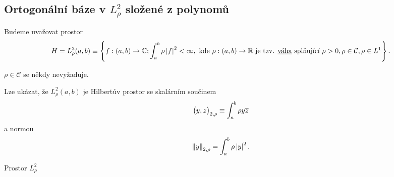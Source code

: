 \subsection{Ortogonální báze v $L^{2}_{\rho}$ složené z polynomů}
Budeme uvažovat prostor
\begin{align*}
    H = L^{2}_{\rho} (a, b) \equiv \left\{ f : (a, b) \to \mathbb{C} ; \int_a^b \rho \left|f\right|^2 < \infty, \text{ kde } \rho : (a, b) \to \mathbb{R} \text{ je tzv. \underline{váha} splňující } \rho > 0, \rho \in \mathcal{C}, \rho \in L^1 \right\}.
\end{align*}
\begin{remark}
    $\rho \in \mathcal{C}$ se někdy nevyžaduje.
\end{remark}
Lze ukázat, že $L^{2}_{\rho}(a, b)$ je Hilbertův prostor se skalárním součinem
\begin{align*}
    \big( y, z \big)_{2, \rho} \equiv \int_a^b \rho y \overline{z}
\end{align*}
a normou
\begin{align*}
    \left\lVert y\right\rVert_{2, \rho} = \int_{a}^{b} \rho \left|y\right|^2.
\end{align*}
\begin{remark}
    Prostor $L^2_{\rho}$ 
\end{remark}